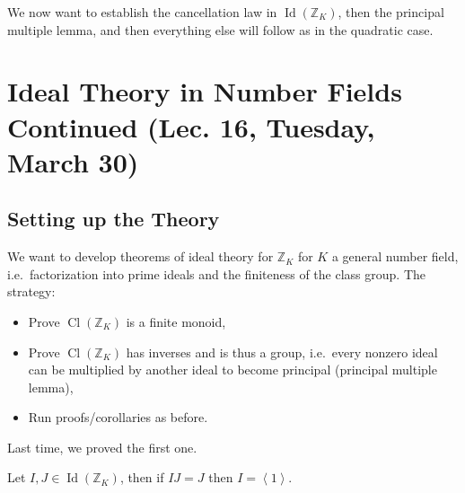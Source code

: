\begin{remark}

We now want to establish the cancellation law in
\(\operatorname{Id}({\mathbb{Z}}_K)\), then the principal multiple
lemma, and then everything else will follow as in the quadratic case.

\end{remark}

\hypertarget{ideal-theory-in-number-fields-continued-lec.-16-tuesday-march-30}{%
\section{Ideal Theory in Number Fields Continued (Lec. 16, Tuesday,
March
30)}\label{ideal-theory-in-number-fields-continued-lec.-16-tuesday-march-30}}

\hypertarget{setting-up-the-theory}{%
\subsection{Setting up the Theory}\label{setting-up-the-theory}}

\begin{remark}

We want to develop theorems of ideal theory for \({\mathbb{Z}}_K\) for
\(K\) a general number field, i.e.~factorization into prime ideals and
the finiteness of the class group. The strategy:

\begin{itemize}
\tightlist
\item
  Prove \(\operatorname{Cl}({\mathbb{Z}}_K)\) is a finite monoid,
\item
  Prove \(\operatorname{Cl}({\mathbb{Z}}_K)\) has inverses and is thus a
  group, i.e.~every nonzero ideal can be multiplied by another ideal to
  become principal (principal multiple lemma),
\item
  Run proofs/corollaries as before.
\end{itemize}

Last time, we proved the first one.

\end{remark}

\begin{lemma}

Let \(I, J \in \operatorname{Id}({\mathbb{Z}}_K)\), then if \(IJ = J\)
then \(I = \left\langle{ 1 }\right\rangle\).

\end{lemma}

